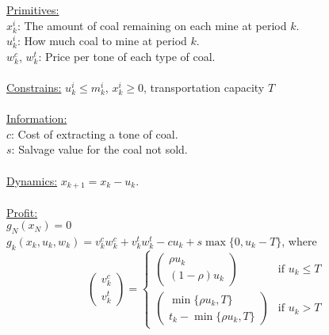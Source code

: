 \documentclass[11pt, english]{article}
\begin{document}
\underline{Primitives:}\\
$x_k^i$: The amount of coal remaining on each mine at period $k$.\\
$u_k^i$: How much coal to mine at period $k$. \\
$w_k^c$, $w_k^t$: Price per tone of each type of coal.\\\\
\underline{Constrains:} $u_k^i\leq m_k^i$, $x_k^i\geq 0$, transportation capacity $T$\\\\
\underline{Information:}\\
$c$: Cost of extracting a tone of coal.\\
$s$: Salvage value for the coal not sold.\\\\
\underline{Dynamics:}
$x_{k+1}=x_k-u_k$.\\\\
\underline{Profit:}\\
$g_N(x_N)=0$\\
$g_k(x_k,u_k,w_k)=v_k^cw_k^c+v_k^tw_k^t-cu_k+s\max\{0,u_k-T\}$, where $$\left(\begin{array}{c}
v_k^c\\
v_k^t
\end{array}\right)=\left\{\begin{array}{ll}
\left(\begin{array}{c}
\rho u_k\\
(1-\rho)u_k
\end{array}\right) & \text{if } u_k\leq T\\
\left(\begin{array}{c}
\min\{\rho u_k,T\}\\
t_k-\min\{\rho u_k,T\}
\end{array}\right) & \text{if } u_k> T
\end{array}\right.$$
\end{document}
